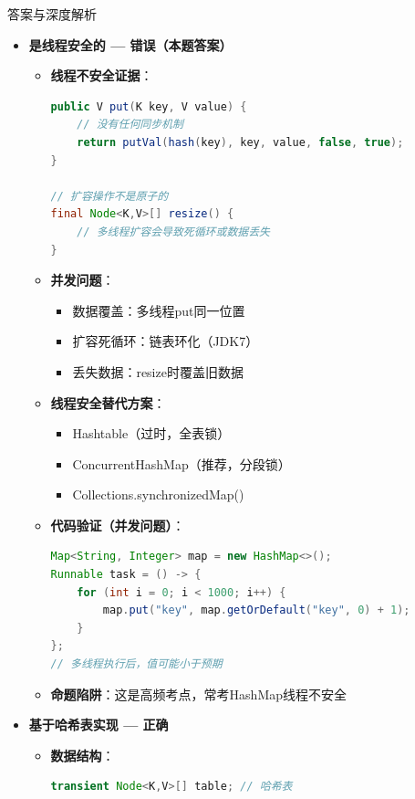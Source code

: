 \documentclass[12pt, a4paper]{ctexart}
\begin{document}
\begin{enumerate}[label=\textbf{\arabic*.}]
\begin{bluebox}{答案与深度解析}
\begin{itemize}[leftmargin=*, nosep, label={}]
			      \item[C] \textbf{是线程安全的 — 错误（本题答案）}
			            \begin{itemize}[label={}, leftmargin=*, nosep]
				            \item \textbf{线程不安全证据}：
				                  \begin{lstlisting}[language=Java]
public V put(K key, V value) {
    // 没有任何同步机制
    return putVal(hash(key), key, value, false, true);
}

// 扩容操作不是原子的
final Node<K,V>[] resize() {
    // 多线程扩容会导致死循环或数据丢失
}
				      \end{lstlisting}
				            \item \textbf{并发问题}：
				                  \begin{itemize}[label={}, nosep]
					                  \item 数据覆盖：多线程put同一位置
					                  \item 扩容死循环：链表环化（JDK7）
					                  \item 丢失数据：resize时覆盖旧数据
				                  \end{itemize}
				            \item \textbf{线程安全替代方案}：
				                  \begin{itemize}[label={}, nosep]
					                  \item Hashtable（过时，全表锁）
					                  \item ConcurrentHashMap（推荐，分段锁）
					                  \item Collections.synchronizedMap()
				                  \end{itemize}
				            \item \textbf{代码验证（并发问题）}：
				                  \begin{lstlisting}[language=Java]
Map<String, Integer> map = new HashMap<>();
Runnable task = () -> {
    for (int i = 0; i < 1000; i++) {
        map.put("key", map.getOrDefault("key", 0) + 1);
    }
};
// 多线程执行后，值可能小于预期
				      \end{lstlisting}
				            \item \textbf{命题陷阱}：这是高频考点，常考HashMap线程不安全
			            \end{itemize}

			      \item[D] \textbf{基于哈希表实现 — 正确}
			            \begin{itemize}[label={}, leftmargin=*, nosep]
				            \item \textbf{数据结构}：
				                  \begin{lstlisting}[language=Java]
transient Node<K,V>[] table; // 哈希表


\end{lstlisting}
\end{itemize}
\end{itemize}
\end{bluebox}
\end{enumerate}
\end{document}
